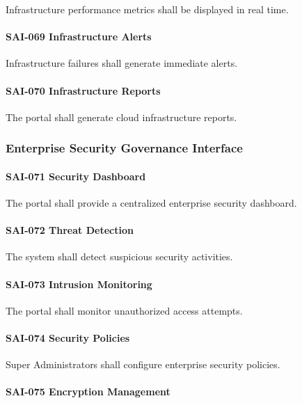Infrastructure performance metrics shall be displayed in real time.

\paragraph{SAI-069 Infrastructure Alerts}

Infrastructure failures shall generate immediate alerts.

\paragraph{SAI-070 Infrastructure Reports}

The portal shall generate cloud infrastructure reports.


\subsubsection*{Enterprise Security Governance Interface}

\paragraph{SAI-071 Security Dashboard}

The portal shall provide a centralized enterprise security dashboard.

\paragraph{SAI-072 Threat Detection}

The system shall detect suspicious security activities.

\paragraph{SAI-073 Intrusion Monitoring}

The portal shall monitor unauthorized access attempts.

\paragraph{SAI-074 Security Policies}

Super Administrators shall configure enterprise security policies.

\paragraph{SAI-075 Encryption Management}

